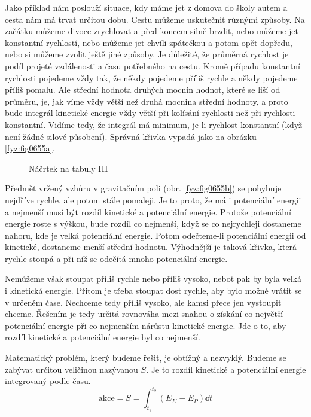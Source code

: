     Jako příklad nám poslouží situace, kdy máme jet z domova do školy autem a cesta nám má trvat
    určitou dobu. Cestu můžeme uskutečnit různými způsoby. Na začátku můžeme divoce zrychlovat a
    před koncem silně brzdit, nebo můžeme jet konstantní rychlostí, nebo můžeme jet chvíli zpátečkou
    a potom opět dopředu, nebo si můžeme zvolit ještě jiné způsoby. Je důležité, že průměrná
    rychlost je podíl projeté vzdálenosti a času potřebného na cestu. Kromě případu konstantní
    rychlosti pojedeme vždy tak, že někdy pojedeme příliš rychle a někdy pojedeme příliš pomalu. Ale
    střední hodnota druhých mocnin hodnot, které se liší od průměru, je, jak víme vždy větší než
    druhá mocnina střední hodnoty, a proto bude integrál kinetické energie vždy větší při kolísání
    rychlosti než při rychlosti konstantní. Vidíme tedy, že integrál má minimum, je-li rychlost
    konstantní (když není žádné silové působení). Správná křivka vypadá jako na obrázku
    \ref{fyz:fig0655a}.
    
    \begin{figure}[ht!]
      \centering
        \hfill
      \caption{Náčrtek na tabuly III}
      \label{fyz:fig0655}
    \end{figure}

    Předmět vržený vzhůru v gravitačním poli (obr. \ref{fyz:fig0655b}) se pohybuje nejdříve rychle,
    ale potom stále pomaleji. Je to proto, že má i potenciální energii a nejmenší musí být rozdíl
    kinetické a potenciální energie. Protože potenciální energie roste s výškou, bude rozdíl co
    nejmenší, když se co nejrychleji dostaneme nahoru, kde je velká potenciální energie. Potom
    odečteme-li potenciální energii od kinetické, dostaneme menší střední hodnotu. Výhodnější je
    taková křivka, která rychle stoupá a při níž se odečítá mnoho potenciální energie.

    Nemůžeme však stoupat příliš rychle nebo příliš vysoko, neboť pak by byla velká i kinetická
    energie. Přitom je třeba stoupat dost rychle, aby bylo možné vrátit se v určeném čase. Nechceme
    tedy příliš vysoko, ale kamsi přece jen vystoupit chceme. Řešením je tedy určitá rovnováha mezi
    snahou o získání co největší potenciální energie při co nejmenším nárůstu kinetické energie. Jde
    o to, aby rozdíl kinetické a potenciální energie byl co nejmenší.

    Matematický problém, který budeme řešit, je obtížný a nezvyklý. Budeme se zabývat určitou
    veličinou nazývanou  \(S\). Je to rozdíl kinetické a potenciální energie
    integrovaný podle času.
    \begin{equation*}
      \text{akce} = S = \int_{t_1}^{t_2}\left(E_K - E_P\right)\dd{t}
    \end{equation*}

